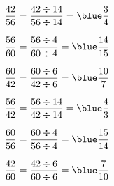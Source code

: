 \ \\ [-5mm]
    \begin{colenumerate}{2}
       \item $\dfrac{42}{56} =\dfrac{42\div14}{56\div14} ={\blue \dfrac{3}{4}}$ \medskip
       \item $\dfrac{56}{60} =\dfrac{56\div4}{60\div4} ={\blue \dfrac{14}{15}}$ \medskip
       \item $\dfrac{60}{42} =\dfrac{60\div6}{42\div6} ={\blue \dfrac{10}{7}}$
       \item $\dfrac{56}{42} =\dfrac{56\div14}{42\div14} ={\blue \dfrac{4}{3}}$
       \item $\dfrac{60}{56} =\dfrac{60\div4}{56\div4} ={\blue \dfrac{15}{14}}$
       \item $\dfrac{42}{60} =\dfrac{42\div6}{60\div6} ={\blue \dfrac{7}{10}}$
   \end{colenumerate}

